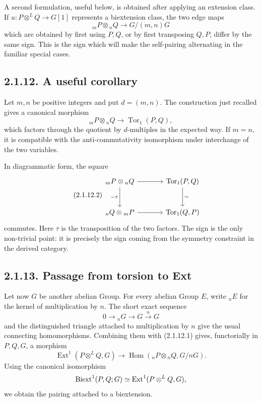\documentclass[11pt]{article}
\providecommand{\Tor}{\operatorname{Tor}}
\providecommand{\Hom}{\operatorname{Hom}}
\providecommand{\Ext}{\operatorname{Ext}}
\begin{document}
A second formulation, useful below, is obtained after applying an extension class.  If \(u:P\otimes^LQ\to G[1]\) represents a biextension class, the two edge maps
\[
        {}_mP\otimes {}_nQ\longrightarrow G/(m,n)G
\]
which are obtained by first using \(P,Q\), or by first transposing \(Q,P\), differ by the same sign.  This is the sign which will make the self-pairing alternating in the familiar special cases.

\subsection*{2.1.12. A useful corollary}

Let \(m,n\) be positive integers and put \(d=(m,n)\).  The construction just recalled gives a canonical morphism
\begin{equation}\tag{2.1.12.1}
        {}_mP\otimes {}_nQ\longrightarrow \Tor_1(P,Q),
\end{equation}
which factors through the quotient by \(d\)-multiples in the expected way.  If \(m=n\), it is compatible with the anti-commutativity isomorphism under interchange of the two variables.

In diagrammatic form, the square
\begin{equation}\tag{2.1.12.2}
\begin{tikzcd}[column sep=large,row sep=large]
{}_mP\otimes {}_nQ\arrow[r]\arrow[d,"-\tau"']&\Tor_1(P,Q)\arrow[d,"\sim"]\\
{}_nQ\otimes {}_mP\arrow[r]&\Tor_1(Q,P)
\end{tikzcd}
\end{equation}
commutes.  Here \(\tau\) is the transposition of the two factors.  The sign is the only non-trivial point: it is precisely the sign coming from the symmetry constraint in the derived category.

\subsection*{2.1.13. Passage from torsion to Ext}

Let now \(G\) be another abelian Group.  For every abelian Group \(E\), write \({}_nE\) for the kernel of multiplication by \(n\).  The short exact sequence
\begin{equation}\tag{2.1.13.1}
        0\longrightarrow {}_nG\longrightarrow G\xrightarrow{n}G
\end{equation}
and the distinguished triangle attached to multiplication by \(n\) give the usual connecting homomorphisms.  Combining them with (2.1.12.1) gives, functorially in \(P,Q,G\), a morphism
\begin{equation}\tag{2.1.13.2}
        \Ext^1(P\otimes^LQ,G)\longrightarrow
        \Hom({}_nP\otimes {}_nQ,G/nG).
\end{equation}
Using the canonical isomorphism
\[
        \Biext^1(P,Q;G)\simeq \Ext^1(P\otimes^LQ,G),
\]
we obtain the pairing attached to a biextension.
\end{document}

